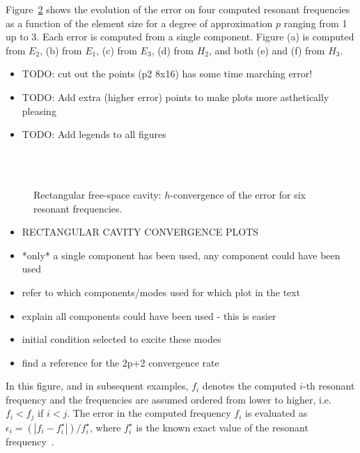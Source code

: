 \begin{figure}[!ht]
	\centering
	\label{fig:rectangle2DfreeSpace_filteringConvergence}
\end{figure}
Figure~\ref{fig:rectangle2DfreeSpace_Convergence} shows the evolution of the
error on four computed resonant frequencies as a function of the element size
for a degree of approximation $p$ ranging from 1 up to 3. Each error is computed
from a single component. Figure (a) is computed from $E_2$, (b) from $E_1$, (c)
from $E_3$, (d) from $H_2$, and both (e) and (f) from $H_3$.
\begin{itemize}
\item TODO: cut out the points (p2 8x16) has some time marching error!
\item TODO: Add extra (higher error) points to make plots more asthetically
  pleasing
\item TODO: Add legends to all figures
\end{itemize}
\begin{figure}[!ht]
	\centering
    \\
    \\
	\caption{Rectangular free-space cavity: $h$-convergence of the error for six resonant frequencies.}
	\label{fig:rectangle2DfreeSpace_Convergence}
\end{figure}
\begin{itemize}
\item RECTANGULAR CAVITY CONVERGENCE PLOTS
\item *only* a single component has been used, any component could have been used
\item refer to which components/modes used for which plot in the text
\item explain all components could have been used - this is easier
\item initial condition selected to excite these modes
\item find a reference for the 2p+2 convergence rate
\end{itemize}
In this figure, and in subsequent examples, $f_i$ denotes the computed $i$-th resonant frequency and the frequencies are assumed ordered from lower to higher, i.e. $f_i < f_j$ if $i<j$. The error in the computed frequency $f_i$ is evaluated as $\epsilon_i = (|f_i - f_i^\star|)/f_i^\star$, where $f_i^\star$ is the known exact value of the resonant frequency~\cite{BalanisBook}.

